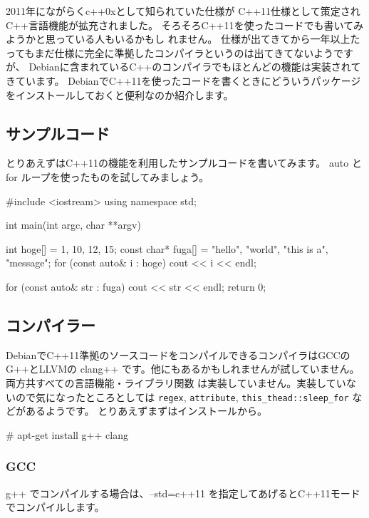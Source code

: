 \documentclass[mingoth,a4paper]{jsarticle}
\begin{document}
2011年にながらくc++0xとして知られていた仕様が
C++11仕様\cite{n3242}として策定されC++言語機能が拡充されました。
そろそろC++11を使ったコードでも書いてみようかと思っている人もいるかもし
れません。
仕様が出てきてから一年以上たってもまだ仕様に完全に準拠したコンパイラというのは出てきてないようですが、
Debianに含まれているC++のコンパイラでもほとんどの機能は実装されてきています。
DebianでC++11を使ったコードを書くときにどういうパッケージをインストールしておくと便利なのか紹介します。

\subsection{サンプルコード}

とりあえずはC++11の機能を利用したサンプルコードを書いてみます。
auto と for ループを使ったものを試してみましょう。

\begin{commandline}
#include <iostream>
using namespace std;

int main(int argc, char **argv) {
  int hoge[] = { 1, 10, 12, 15};
  const char* fuga[] = { "hello", "world", "this is a", "message"};
  for (const auto& i : hoge) {
    cout << i << endl;
  }

  for (const auto& str : fuga) {
    cout << str << endl;
  }
  return 0;
}
\end{commandline}

\subsection{コンパイラー}

DebianでC++11準拠のソースコードをコンパイルできるコンパイラはGCCのG++とLLVMの
clang++ です。他にもあるかもしれませんが試していません。両方共すべての言語機能・ライブラリ関数
は実装していません\cite{gcc11support,clang11support}。実装していないので気になったところとしては \texttt{regex}, \texttt{attribute},
\verb!this_thead::sleep_for! などがあるようです。
とりあえずまずはインストールから。

\begin{commandline}
# apt-get install g++ clang
\end{commandline}

\subsubsection{GCC}

g++ でコンパイルする場合は、--std=c++11 を指定してあげるとC++11モードでコンパイルします。
\end{document}
